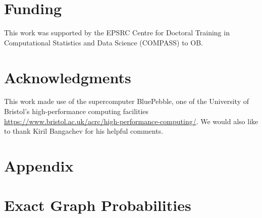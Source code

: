 \documentclass{article}
\begin{document}
\section*{Funding}
This work was supported by the EPSRC Centre for Doctoral Training in Computational Statistics and Data Science (COMPASS) to OB. 

\section*{Acknowledgments}
This work made use of the supercomputer BluePebble, one of the University of Bristol's high-performance computing facilities \url{https://www.bristol.ac.uk/acrc/high-performance-computing/}. We would also like to thank Kiril Bangachev for his helpful comments.

\appendix
\section*{Appendix}
\section{Exact Graph Probabilities}
\label{exact_calcs}
\end{document}
